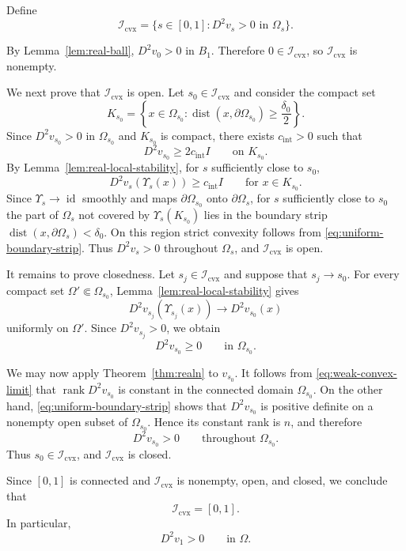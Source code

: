 \documentclass{article}
\numberwithin{equation}{section}
\begin{document}
Define
\[
\mathcal I_{\mathrm{cvx}}
=
\{s\in[0,1]:D^2v_s>0\text{ in }\Omega_s\}.
\]

By Lemma~\ref{lem:real-ball}, $D^2v_0>0$ in $B_1$. Therefore
$0\in\mathcal I_{\mathrm{cvx}}$, so
$\mathcal I_{\mathrm{cvx}}$ is nonempty.

We next prove that $\mathcal I_{\mathrm{cvx}}$ is open. Let
$s_0\in\mathcal I_{\mathrm{cvx}}$ and consider the compact set
\[
K_{s_0}
=
\left\{
x\in\Omega_{s_0}:
\operatorname{dist}(x,\partial\Omega_{s_0})
\ge\frac{\delta_0}{2}
\right\}.
\]
Since $D^2v_{s_0}>0$ in $\Omega_{s_0}$ and $K_{s_0}$ is compact,
there exists $c_{\mathrm{int}}>0$ such that
\[
D^2v_{s_0}\ge 2c_{\mathrm{int}}I
\qquad\text{on }K_{s_0}.
\]
By Lemma~\ref{lem:real-local-stability}, for $s$ sufficiently close
to $s_0$,
\[
D^2v_s(\Upsilon_s(x))
\ge c_{\mathrm{int}}I
\qquad\text{for }x\in K_{s_0}.
\]
Since $\Upsilon_s\to\operatorname{id}$ smoothly and maps
$\partial\Omega_{s_0}$ onto $\partial\Omega_s$, for $s$ sufficiently
close to $s_0$ the part of $\Omega_s$ not covered by
$\Upsilon_s(K_{s_0})$ lies in the boundary strip
$\operatorname{dist}(x,\partial\Omega_s)<\delta_0$. On this region
strict convexity follows from \eqref{eq:uniform-boundary-strip}.
Thus $D^2v_s>0$ throughout $\Omega_s$, and
$\mathcal I_{\mathrm{cvx}}$ is open.

It remains to prove closedness. Let
$s_j\in\mathcal I_{\mathrm{cvx}}$ and suppose that $s_j\to s_0$.
For every compact set $\Omega'\Subset\Omega_{s_0}$,
Lemma~\ref{lem:real-local-stability} gives
\[
D^2v_{s_j}(\Upsilon_{s_j}(x))
\longrightarrow
D^2v_{s_0}(x)
\]
uniformly on $\Omega'$. Since
$D^2v_{s_j}>0$, we obtain
\begin{equation}\label{eq:weak-convex-limit}
D^2v_{s_0}\ge0
\qquad\text{in }\Omega_{s_0}.
\end{equation}

We may now apply
Theorem~\ref{thm:realn} to $v_{s_0}$.
It follows from \eqref{eq:weak-convex-limit} that
$\operatorname{rank}D^2v_{s_0}$ is constant in the connected domain
$\Omega_{s_0}$. On the other hand,
\eqref{eq:uniform-boundary-strip} shows that $D^2v_{s_0}$ is positive
definite on a nonempty open subset of $\Omega_{s_0}$. Hence its
constant rank is $n$, and therefore
\[
D^2v_{s_0}>0
\qquad\text{throughout }\Omega_{s_0}.
\]
Thus $s_0\in\mathcal I_{\mathrm{cvx}}$, and
$\mathcal I_{\mathrm{cvx}}$ is closed.

Since $[0,1]$ is connected and
$\mathcal I_{\mathrm{cvx}}$ is nonempty, open, and closed, we conclude
that
\[
\mathcal I_{\mathrm{cvx}}=[0,1].
\]
In particular,
\[
D^2v_1>0
\qquad\text{in }\Omega.
\]
\end{document}
